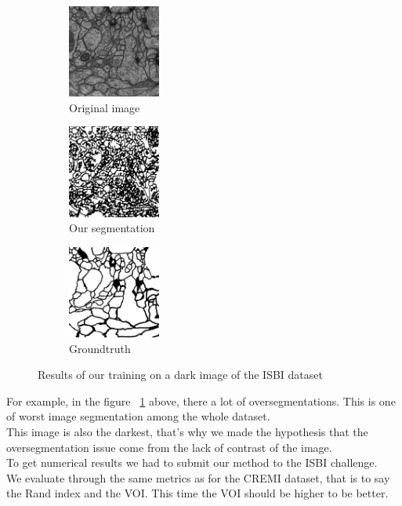 \begin{figure}[!htbp]
    \centering
    \begin{subfigure}[t]{0.31\textwidth}
        \centering
        \includegraphics[height=1.2in]{./images/isbi_orig_2.png}
        \caption{Original image}
    \end{subfigure}%
    \begin{subfigure}[t]{0.31\textwidth}
        \centering
        \includegraphics[height=1.2in]{./images/isbi_out_2.png}
        \caption{Our segmentation}
    \end{subfigure}
    \begin{subfigure}[t]{0.31\textwidth}
        \centering
        \includegraphics[height=1.2in]{./images/isbi_gt_2.png}
        \caption{Groundtruth}
    \end{subfigure}
    \caption{Results of our training on a dark image of the ISBI dataset}
    \label{fig:isbi}
\end{figure}

For example, in the figure ~\ref{fig:isbi} above, there a lot of oversegmentations. This is one of worst image segmentation among the whole dataset.\\
This image is also the darkest, that's why we made the hypothesis that the oversegmentation issue come from the lack of contrast of the image.\\

To get numerical results we had to submit our method to the ISBI challenge.\\
We evaluate through the same metrics as for the CREMI dataset, that is to say the Rand index and the VOI.
This time the VOI should be higher to be better.\\


